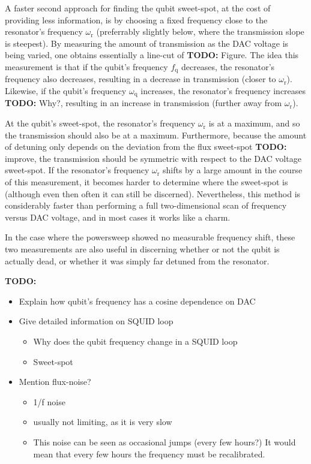 \documentclass[12pt]{report}
\newcommand{\wres}{\omega_\text{r}}
\newcommand{\fqub}{f_\text{q}}
\newcommand{\wqub}{\omega_\text{q}}
\begin{document}
        A faster second approach for finding the qubit sweet-spot, at the cost of providing less information, is by choosing a fixed frequency close to the resonator's frequency $\wres$ (preferrably slightly below, where the transmission slope is steepest). By measuring the amount of transmission as the DAC voltage is being varied, one obtains essentially a line-cut of \textbf{TODO:} Figure. The idea this measurement is that if the qubit's frequency $\fqub$ decreases, the resonator's frequency also decreases, resulting in a decrease in transmission (closer to $\wres$). Likewise, if the qubit's frequency $\wqub$ increases, the resonator's frequency increases \textbf{TODO:} Why?, resulting in an increase in transmission (further away from $\wres$).

        At the qubit's sweet-spot, the resonator's frequency $\wres$ is at a maximum, and so the transmission should also be at a maximum. Furthermore, because the amount of detuning only depends on the deviation from the flux sweet-spot \textbf{TODO:} improve, the transmission should be symmetric with respect to the DAC voltage sweet-spot. If the resonator's frequency $\wres$ shifts by a large amount in the course of this measurement, it becomes harder to determine where the sweet-spot is (although even then often it can still be discerned). Nevertheless, this method is considerably faster than performing a full two-dimensional scan of frequency versus DAC voltage, and in most cases it works like a charm.

        In the case where the powersweep showed no measurable frequency shift, these two measurements are also useful in discerning whether or not the qubit is actually dead, or whether it was simply far detuned from the resonator.


        \textbf{TODO:}
        \begin{itemize}
          \item Explain how qubit's frequency has a cosine dependence on DAC
          \item Give detailed information on SQUID loop
          \begin{itemize}
            \item Why does the qubit frequency change in a SQUID loop
            \item Sweet-spot
          \end{itemize}
          \item Mention flux-noise?
          \begin{itemize}
            \item 1/f noise
            \item usually not limiting, as it is very slow
            \item This noise can be seen as occasional jumps (every few hours?) It would mean that every few hours the frequency must be recalibrated.
          \end{itemize}
        \end{itemize}
\end{document}
